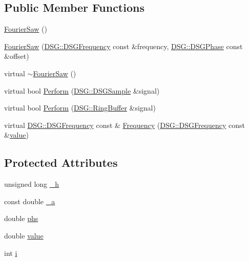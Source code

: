 \subsection*{Public Member Functions}
\begin{DoxyCompactItemize}
\item 
\hyperlink{class_d_s_g_1_1_fourier_1_1_fourier_saw_acfef03c4384ef656110c51102e346c49}{Fourier\+Saw} ()
\item 
\hyperlink{class_d_s_g_1_1_fourier_1_1_fourier_saw_a6062c388900f32e1cfd6df95b9760065}{Fourier\+Saw} (\hyperlink{namespace_d_s_g_a4315a061386fa1014fda09b15d3a6973}{D\+S\+G\+::\+D\+S\+G\+Frequency} const \&frequency, \hyperlink{namespace_d_s_g_a44431ce1eb0a7300efdd207bc879e52c}{D\+S\+G\+::\+D\+S\+G\+Phase} const \&offset)
\item 
virtual \hyperlink{class_d_s_g_1_1_fourier_1_1_fourier_saw_acd28c4942553271ed9f39e8f05b8db6d}{$\sim$\+Fourier\+Saw} ()
\item 
virtual bool \hyperlink{class_d_s_g_1_1_fourier_1_1_fourier_saw_a33061612ff24180f12e9a2c29dfaa116}{Perform} (\hyperlink{namespace_d_s_g_ac39a94cd27ebcd9c1e7502d0c624894a}{D\+S\+G\+::\+D\+S\+G\+Sample} \&signal)
\item 
virtual bool \hyperlink{class_d_s_g_1_1_fourier_1_1_fourier_saw_ac890d9f0af523b63b96b07e6696a32b7}{Perform} (\hyperlink{class_d_s_g_1_1_ring_buffer}{D\+S\+G\+::\+Ring\+Buffer} \&signal)
\item 
virtual \hyperlink{namespace_d_s_g_a4315a061386fa1014fda09b15d3a6973}{D\+S\+G\+::\+D\+S\+G\+Frequency} const \& \hyperlink{class_d_s_g_1_1_fourier_1_1_fourier_saw_afa3d86f404be3665f10c74fe9286ef10}{Frequency} (\hyperlink{namespace_d_s_g_a4315a061386fa1014fda09b15d3a6973}{D\+S\+G\+::\+D\+S\+G\+Frequency} const \&\hyperlink{class_d_s_g_1_1_fourier_1_1_fourier_saw_a97d69a0c03cfb66b1cf6e13fe7073c12}{value})
\end{DoxyCompactItemize}
\subsection*{Protected Attributes}
\begin{DoxyCompactItemize}
\item 
unsigned long \hyperlink{class_d_s_g_1_1_fourier_1_1_fourier_saw_a78d30240b7eb99fcb249b5aafe3d55b2}{\+\_\+h}
\item 
const double \hyperlink{class_d_s_g_1_1_fourier_1_1_fourier_saw_a54895160b61b8d84dc967e7815d07869}{\+\_\+a}
\item 
double \hyperlink{class_d_s_g_1_1_fourier_1_1_fourier_saw_a5df3e5b00224924e106ffdc1d0b6a3cc}{phs}
\item 
double \hyperlink{class_d_s_g_1_1_fourier_1_1_fourier_saw_a97d69a0c03cfb66b1cf6e13fe7073c12}{value}
\item 
int \hyperlink{class_d_s_g_1_1_fourier_1_1_fourier_saw_a261b19d0082558b6e1bb128d267c400d}{i}
\end{DoxyCompactItemize}
